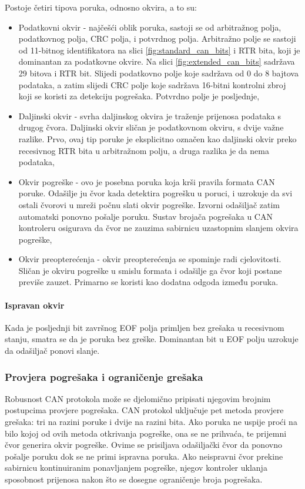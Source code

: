 Postoje četiri tipova poruka, odnosno okvira, a to su:
\begin{itemize}
	\item Podatkovni okvir - najčešći oblik poruka, sastoji se od arbitražnog polja, podatkovnog polja, CRC polja, i potvrdnog polja. Arbitražno polje se sastoji od 11-bitnog identifikatora na slici \ref{fig:standard_can_bits} i RTR bita, koji je dominantan za podatkovne okvire. Na slici \ref{fig:extended_can_bits} sadržava 29 bitova i RTR bit. Slijedi podatkovno polje koje sadržava od 0 do 8 bajtova podataka, a zatim slijedi CRC polje koje sadržava 16-bitni kontrolni zbroj koji se koristi za detekciju pogrešaka. Potvrdno polje je posljednje,
	\item Daljinski okvir - svrha daljinskog okvira je traženje prijenosa podataka s drugog čvora. Daljinski okvir sličan je podatkovnom okviru, s dvije važne razlike. Prvo, ovaj tip poruke je eksplicitno označen kao daljinski okvir preko recesivnog RTR bita u arbitražnom polju, a druga razlika je da nema podataka,
	\item Okvir pogreške - ovo je posebna poruka koja krši pravila formata CAN poruke. Odašilje ju čvor kada detektira pogrešku u poruci, i uzrokuje da svi ostali čvorovi u mreži počnu slati okvir pogreške. Izvorni odašiljač zatim automatski ponovno pošalje poruku. Sustav brojača pogrešaka u CAN kontroleru osigurava da čvor ne zauzima sabirnicu uzastopnim slanjem okvira pogreške,
	\item Okvir preopterećenja - okvir preopterećenja se spominje radi cjelovitosti. Sličan je okviru pogreške u smislu formata i odašilje ga čvor koji postane previše zauzet. Primarno se koristi kao dodatna odgoda između poruka.
\end{itemize}

\paragraph{Ispravan okvir}

Kada je posljednji bit završnog EOF polja primljen bez grešaka u recesivnom stanju, smatra se da je poruka bez greške. Dominantan bit u EOF polju uzrokuje da odašiljač ponovi slanje.

\subsubsection{Provjera pogrešaka i ograničenje grešaka}

Robusnost CAN protokola može se djelomično pripisati njegovim brojnim postupcima provjere pogrešaka. CAN protokol uključuje pet metoda provjere grešaka: tri na razini poruke i dvije na razini bita. Ako poruka ne uspije proći na bilo kojoj od ovih metoda otkrivanja pogreške, ona se ne prihvaća, te prijemni čvor generira okvir pogreške. Ovime se prisiljava odašiljački čvor da ponovno pošalje poruku dok se ne primi ispravna poruka. Ako neispravni čvor prekine sabirnicu kontinuiranim ponavljanjem pogreške, njegov kontroler uklanja sposobnost prijenosa nakon što se dosegne ograničenje broja pogrešaka.

